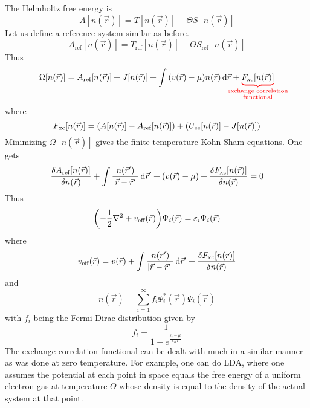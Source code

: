 \documentclass[12pt,a4paper,titlepage]{article}
\newcommand{\trm}[1]{\textrm{#1}} %
\begin{document}
The Helmholtz free energy is
\begin{equation}
A[n(\vec{r})]=T[n(\vec{r})]-\Theta S[n(\vec{r})]
\end{equation}
Let us define a reference system similar as before.
\begin{equation}
A_{\trm{ref}}[n(\vec{r})]=T_{\trm{ref}}[n(\vec{r})]-\Theta S_{\trm{ref}}[n(\vec{r})]
\end{equation}
Thus
\begin{equation}
\Omega[n(\vec{r})]=A_{\trm{ref}}[n(\vec{r})]+J[n(\vec{r})]+\int\qty(v(\vec{r})-\mu)n(\vec{r})\dd{\vec{r}}+{\color{red}\underbrace{\color{black}F_{\trm{xc}}[n(\vec{r})]}_{\mathclap{\substack{\trm{exchange correlation}\\ \trm{functional}}}}}
\end{equation}
where
\begin{equation}
F_{\trm{xc}}[n(\vec{r})]=\qty(A[n(\vec{r})]-A_{\trm{ref}}[n(\vec{r})])+\qty(U_{\trm{ee}}[n(\vec{r})]-J[n(\vec{r})])
\end{equation}
Minimizing $\Omega[n(\vec{r})]$ gives the finite temperature Kohn-Sham equations. One gets
\begin{equation}
\fdv{A_{\trm{ref}}[n(\vec{r})]}{n(\vec{r})}+\int\frac{n(\vec{r}^{\prime})}{\abs{\vec{r}-\vec{r}^{\prime}}}\dd{\vec{r}^{\prime}}+\qty(v(\vec{r})-\mu)+\fdv{F_{\trm{xc}}[n(\vec{r})]}{n(\vec{r})}=0
\end{equation}
Thus
\begin{equation}
\qty(-\frac{1}{2}\nabla^{2}+v_{\trm{eff}}(\vec{r}))\Psi_{i}(\vec{r})=\varepsilon_{i}\Psi_{i}(\vec{r})
\end{equation}
where
\begin{equation}
v_{\trm{eff}}(\vec{r})=v(\vec{r})+\int\frac{n(\vec{r}^{\prime})}{\abs{\vec{r}-\vec{r}^{\prime}}}\dd{\vec{r}^{\prime}}+\fdv{F_{\trm{xc}}[n(\vec{r})]}{n(\vec{r})}
\end{equation}
and
\begin{equation}
n(\vec{r})=\sum_{i=1}^{\infty}f_{i}\Psi_{i}^{*}(\vec{r})\Psi_{i}(\vec{r})
\end{equation}
with $f_{i}$ being the Fermi-Dirac distribution given by
\begin{equation}
f_{i}=\frac{1}{1+e^{\frac{\varepsilon_{i}-\mu}{k_{B}T}}}
\end{equation}
The exchange-correlation functional can be dealt with much in a similar manner as was done at zero temperature. For example, one can do LDA, where one assumes the potential at each point in space equals the free energy of a uniform electron gas at temperature $\Theta$ whose density is equal to the density of the actual system at that point.
\end{document}
